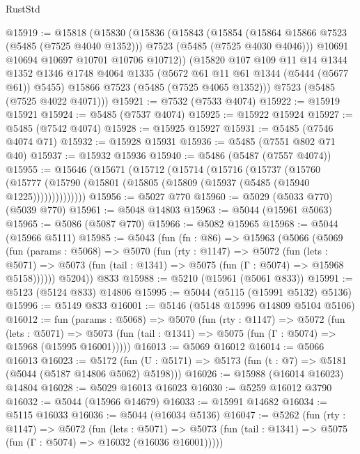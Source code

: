\begin{lexlean}{RustStd}
\begin{coremodule}
@15919 := @15818
    (@15830
      (@15836
        (@15843
          (@15854
            (@15864 @15866 @7523 (@5485 (@7525 @4040 @1352)))
            @7523
            (@5485 (@7525 @4030 @4046)))
          @10691
          @10694
          @10697
          @10701
          @10706
          @10712))
      (@15820
        @107
        @109
        @11
        @14
        @1344
        @1352
        @1346
        @1748
        @4064
        @1335
        (@5672 @61 @11 @61 @1344 (@5444 (@5677 @61)) @5455)
        @15866
        @7523
        (@5485 (@7525 @4065 @1352)))
      @7523
      (@5485 (@7525 @4022 @4071)))
@15921 := @7532 (@7533 @4074)
@15922 := @15919 @15921
@15924 := @5485 (@7537 @4074)
@15925 := @15922 @15924
@15927 := @5485 (@7542 @4074)
@15928 := @15925 @15927
@15931 := @5485 (@7546 @4074 @71)
@15932 := @15928 @15931
@15936 := @5485 (@7551 @802 @71 @40)
@15937 := @15932 @15936
@15940 := @5486 (@5487 (@7557 @4074))
@15955 := @15646
    (@15671
      (@15712
        (@15714
          (@15716
            (@15737
              (@15760
                (@15777 (@15790 (@15801 (@15805 (@15809 (@15937 (@5485 (@15940 @1225))))))))))))))
@15956 := @5027 @770
@15960 := @5029 (@5033 @770) (@5039 @770)
@15961 := @5048 @14803
@15963 := @5044 (@15961 @5063)
@15965 := @5086 (@5087 @770)
@15966 := @5082 @15965
@15968 := @5044 (@15966 @5111)
@15985 := @5043
    (fun (fn : @86) =>
    @15963
      (@5066
        (@5069
          (fun (params : @5068) =>
          @5070
            (fun (rty : @1147) =>
            @5072
              (fun (lets : @5071) =>
              @5073 (fun (tail : @1341) => @5075 (fun (Γ : @5074) => @15968 @5158))))))
        @5204))
    @833
@15988 := @5210 (@15961 (@5061 @833))
@15991 := @5123 (@5124 @833) @14806
@15995 := @5044 (@5115 (@15991 @5132) @5136)
@15996 := @5149 @833
@16001 := @5146 (@5148 @15996 @14809 @5104 @5106)
@16012 := fun (params : @5068) =>
  @5070
    (fun (rty : @1147) =>
    @5072
      (fun (lets : @5071) =>
      @5073 (fun (tail : @1341) => @5075 (fun (Γ : @5074) => @15968 (@15995 @16001)))))
@16013 := @5069 @16012
@16014 := @5066 @16013
@16023 := @5172
    (fun (U : @5171) => @5173 (fun (t : @7) => @5181 (@5044 (@5187 @14806 @5062) @5198)))
@16026 := @15988 (@16014 @16023) @14804
@16028 := @5029 @16013 @16023
@16030 := @5259 @16012 @3790
@16032 := @5044 (@15966 @14679)
@16033 := @15991 @14682
@16034 := @5115 @16033
@16036 := @5044 (@16034 @5136)
@16047 := @5262
    (fun (rty : @1147) =>
    @5072
      (fun (lets : @5071) =>
      @5073 (fun (tail : @1341) => @5075 (fun (Γ : @5074) => @16032 (@16036 @16001)))))

\end{coremodule}
\end{lexlean}
